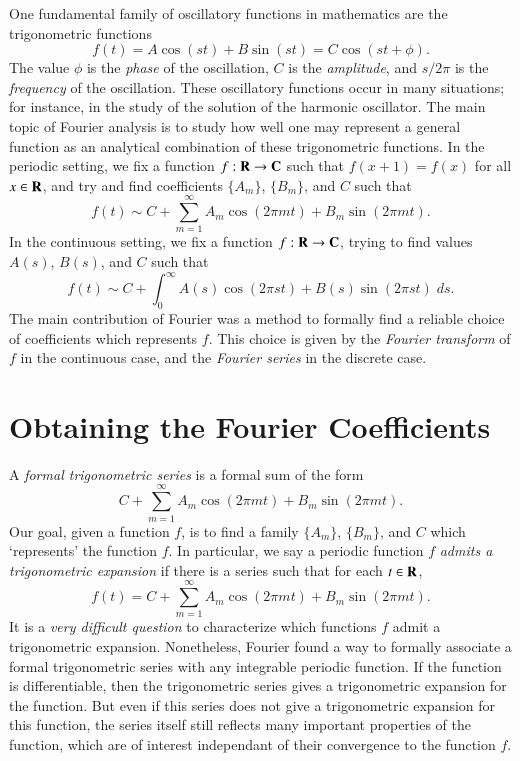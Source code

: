 One fundamental family of oscillatory functions in mathematics are the trigonometric functions
%
\[ f(t) = A \cos(st) + B \sin(st) = C \cos(st + \phi). \]
%
The value $\phi$ is the \emph{phase} of the oscillation, $C$ is the \emph{amplitude}, and $s/2\pi$ is the \emph{frequency} of the oscillation. These oscillatory functions occur in many situations; for instance, in the study of the solution of the harmonic oscillator. The main topic of Fourier analysis is to study how well one may represent a general function as an analytical combination of these trigonometric functions. In the periodic setting, we fix a function $f: \operatorname{\mathbf{R}} \to \operatorname{\mathbf{C}}$ such that $f(x + 1) = f(x)$ for all $x \in \operatorname{\mathbf{R}}$, and try and find coefficients $\{ A_m \}$, $\{ B_m \}$, and $C$ such that
%
\[ f(t) \sim C + \sum_{m = 1}^\infty A_m \cos(2 \pi mt) + B_m \sin(2 \pi mt). \]
%
In the continuous setting, we fix a function $f: \operatorname{\mathbf{R}} \to \operatorname{\mathbf{C}}$, trying to find values $A(s)$, $B(s)$, and $C$ such that
%
\[ f(t) \sim C + \int_0^\infty A(s) \cos(2 \pi st) + B(s) \sin(2 \pi st)\; ds. \]
%
The main contribution of Fourier was a method to formally find a reliable choice of coefficients which represents $f$. This choice is given by the \emph{Fourier transform} of $f$ in the continuous case, and the \emph{Fourier series} in the discrete case.

\section{Obtaining the Fourier Coefficients}

A \emph{formal trigonometric series} is a formal sum of the form
%
\[ C + \sum_{m = 1}^\infty A_m \cos(2\pi mt) + B_m \sin(2\pi mt). \]
%
Our goal, given a function $f$, is to find a family $\{ A_m \}$, $\{ B_m \}$, and $C$ which `represents' the function $f$. In particular, we say a periodic function $f$ \emph{admits a trigonometric expansion} if there is a series such that for each $t \in \operatorname{\mathbf{R}}$,
%
\[ f(t) = C + \sum_{m = 1}^\infty A_m \cos(2 \pi mt) + B_m \sin(2 \pi mt). \]
%
It is a \emph{very difficult question} to characterize which functions $f$ admit a trigonometric expansion. Nonetheless, Fourier found a way to formally associate a formal trigonometric series with any integrable periodic function. If the function is differentiable, then the trigonometric series gives a trigonometric expansion for the function. But even if this series does not give a trigonometric expansion for this function, the series itself still reflects many important properties of the function, which are of interest independant of their convergence to the function $f$.

